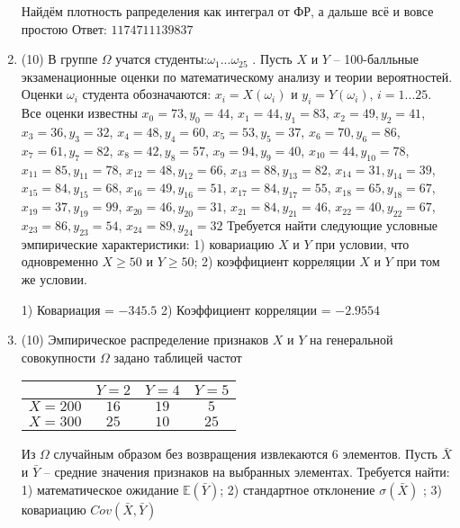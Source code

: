 \documentclass[a4paper,12pt]{article}
\begin{document}
\begin{enumerate}
Найдём плотность рапределения как интеграл от ФР, а дальше всё и вовсе простою Ответ: $1174711139837$


\item


(10) В группе $\Omega$ учатся студенты:$\omega _{1}...\omega _{25}$ . Пусть $X$ и $Y$ – 100-балльные экзаменационные оценки по
математическому анализу и теории вероятностей. Оценки $\omega _{i}$ студента обозначаются: $x _{i} = X(\omega _{i})$ и $y _{i} = Y(\omega _{i})$, $i = 1...25$. Все оценки известны
$x _{0} = 73, y _{0} = 44$, $x _{1} = 44, y _{1} = 83$, $x _{2} = 49, y _{2} = 41$, $x _{3} = 36, y _{3} = 32$, $x _{4} = 48, y _{4} = 60$, $x _{5} = 53, y _{5} = 37$, $x _{6} = 70, y _{6} = 86$, $x _{7} = 61, y _{7} = 82$, $x _{8} = 42, y _{8} = 57$, $x _{9} = 94, y _{9} = 40$, $x _{10} = 44, y _{10} = 78$, $x _{11} = 85, y _{11} = 78$, $x _{12} = 48, y _{12} = 66$, $x _{13} = 88, y _{13} = 82$, $x _{14} = 31, y _{14} = 39$, $x _{15} = 84, y _{15} = 68$, $x _{16} = 49, y _{16} = 51$, $x _{17} = 84, y _{17} = 55$, $x _{18} = 65, y _{18} = 67$, $x _{19} = 37, y _{19} = 99$, $x _{20} = 46, y _{20} = 31$, $x _{21} = 84, y _{21} = 46$, $x _{22} = 40, y _{22} = 67$, $x _{23} = 86, y _{23} = 54$, $x _{24} = 89, y _{24} = 32$
Требуется
найти следующие условные эмпирические характеристики: 1) ковариацию $X$ и $Y$ при условии, что одновременно $X \geqslant 50$
 и $Y \geqslant 50$; 2) коэффициент корреляции $X$ и $Y$ при том же условии.




1) Ковариация = $-345.5$
2) Коэффициент корреляции = $-2.9554$


\item


(10) Эмпирическое распределение признаков $X$ и $Y$ на генеральной совокупности $\Omega$ задано таблицей частот  
 
\begin{tabular}{ | c | c | c | c | }
\hline
 & $Y = 2$ & $Y = 4$ & $Y = 5$  \\ \hline
$X = 200$ & $16$ & $19$ & $5$\\ \hline
$X = 300$ & $25$ & $10$ & $25$\\
\hline
\end{tabular}

Из $\Omega$ случайным образом без возвращения извлекаются $6$ элементов. 
Пусть $\bar X$ и $\bar Y$ – средние значения признаков на выбранных элементах. 
Требуется найти: 1) математическое ожидание $\mathbb{E}(\bar Y)$; 2) стандартное отклонение $\sigma(\bar X)$ ; 
3) ковариацию $Cov(\bar X, \bar Y)$





\end{enumerate}
\end{document}
